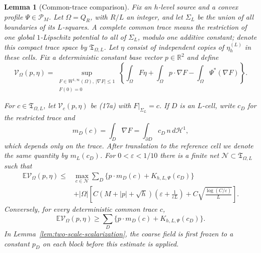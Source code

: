 \documentclass{smfart}
\newtheorem{lemma}[theorem]{Lemma}
\theoremstyle{definition}
\newcommand{\1}{\mathbf 1}
\begin{document}
\begin{lemma}[Common-trace comparison]\label{lem:finite-trace-net}
Fix an $h$-level source and a convex profile $\Psi\in\mathscr P_ M$.
Let $\Omega=Q_ R$, with $R/L$ an integer, and let $\Sigma_ L$ be
the union of all boundaries of its $L$-squares.  A complete common
trace means the restriction of one global $1$-Lipschitz potential to
all of $\Sigma_ L$, modulo one additive constant; denote this compact
trace space by $\mathfrak T_ {\Omega,L}$.  Let $\eta$ consist of independent
copies of $\eta_h^{(L)}$ in these cells.  Fix a deterministic constant
base vector $p\in\mathbb R^2$ and define
\begin{equation}
\mathcal V_ {\Omega}(p,\eta)=
\sup_ {\substack{F\in W^{1,\infty}(\Omega),\ |\nabla F|\leq1\\F(0)=0}}
\left\{\int_ \Omega F\eta+\int_ \Omega p\cdot\nabla F
-\int_ \Omega\Psi^*(\nabla F)\right\}.
\tag{17a}
\end{equation}

For $c\in\mathfrak T_ {\Omega,L}$, let
$\mathcal V_ c(p,\eta)$ be (17a) with $F|_ {\Sigma_ L}=c$.
If $D$ is an $L$-cell, write $c_ D$ for
the restricted trace and
\begin{equation}
m_ D(c)=\int_ D\nabla F
=\int_ {\partial D}c_ D\,n\,d\mathcal H^1,
\tag{17b}
\end{equation}
which depends only on the trace.  After translation to the reference
cell we denote the same quantity by $m_ L(c_ D)$.  For
$0<\varepsilon<1/10$ there is
a finite net $\mathcal N\subset\mathfrak T_ {\Omega,L}$ such that
\begin{equation}
\begin{split}
\mathbb E\mathcal V_ \Omega(p,\eta)
\leq{}&\max_ {c\in\mathcal N}
\sum_ D\{p\cdot m_ D(c)+K_ {h,L,\Psi}(c_ D)\}\\
&+|\Omega|\left[
C(M+|p|+\sqrt h)\left(\varepsilon+\frac1{\varepsilon L}\right)
+C\sqrt{\frac{\log(C/\varepsilon)}L}\right].                   
\end{split}
\tag{17}
\end{equation}
Conversely, for every deterministic common trace $c$,
\begin{equation}
\mathbb E\mathcal V_ \Omega(p,\eta)
\geq\sum_ D\{p\cdot m_ D(c)+K_ {h,L,\Psi}(c_ D)\}.
\tag{17c}
\end{equation}
In Lemma~\ref{lem:two-scale-scalarization}, the coarse field is first
frozen to a constant $p_D$ on each block before this estimate is applied.


\end{lemma}
\end{document}
